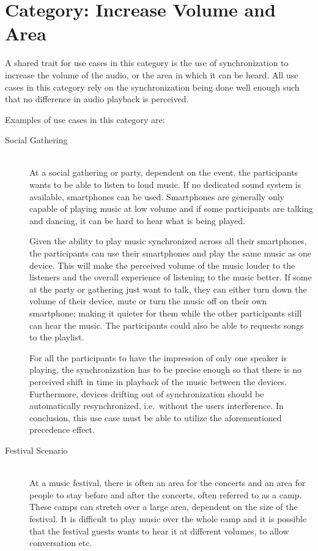 \section{Category: Increase Volume and Area}\label{sec:category_increase_volume_and_area}
A shared trait for use cases in this category is the use of synchronization to increase the volume of the audio, or the area in which it can be heard.
All use cases in this category rely on the synchronization being done well enough such that no difference in audio playback is perceived.

Examples of use cases in this category are:
\begin{description}
    \item[Social Gathering] \hfill\\
        At a social gathering or party, dependent on the event, the participants wants to be able to listen to loud music.
        If no dedicated sound system is available, smartphones can be used.
        Smartphones are generally only capable of playing music at low volume and if some participants are talking and dancing, it can be hard to hear what is being played.

        Given the ability to play music synchronized across all their smartphones, the participants can use their smartphones and play the same music as one device.
        This will make the perceived volume of the music louder to the listeners and the overall experience of listening to the music better.
        If some at the party or gathering just want to talk, they can either turn down the volume of their device, mute or turn the music off on their own smartphone;
        making it quieter for them while the other participants still can hear the music.
        The participants could also be able to requests songs to the playlist.

        For all the participants to have the impression of only one speaker is playing,
        the synchronization has to be precise enough so that there is no perceived shift in time in playback of the music between the devices.
        Furthermore, devices drifting out of synchronization should be automatically resynchronized, i.e.\ without the users interference.
        In conclusion, this use case must be able to utilize the aforementioned precedence effect.

    \item[Festival Scenario] \hfill\\
        At a music festival, there is often an area for the concerts and an area for people to stay before and after the concerts, often referred to as a camp.
        These camps can stretch over a large area, dependent on the size of the festival.
        It is difficult to play music over the whole camp and it is possible that the festival guests wants to hear it at different volumes, to allow conversation etc.


\end{description}

